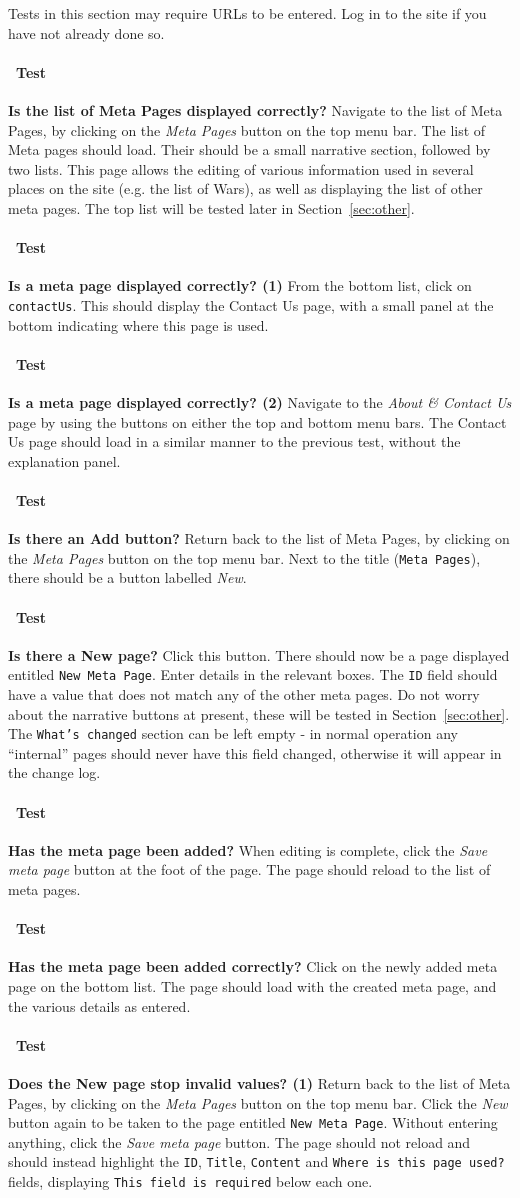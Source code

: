 \documentclass[12pt]{article}
\newcounter{Test}
\newcommand{\test}[1]{%
\stepcounter{Test}%
\paragraph{\Circle\ Test \theTest} \textbf{#1} }
\begin{document}
Tests in this section may require URLs to be entered. Log in to the site if you have not already done so.

\test{Is the list of Meta Pages displayed correctly?}
Navigate to the list of Meta Pages, by clicking on the \textit{Meta Pages} button on the top menu bar. The list of Meta pages should load. Their should be a small narrative section, followed by two lists. This page allows the editing of various information used in several places on the site (e.g. the list of Wars), as well as displaying the list of other meta pages. The top list will be tested later in Section~\ref{sec:other}.

\test{Is a meta page displayed correctly? (1)}
From the bottom list, click on \texttt{contactUs}. This should display the Contact Us page, with a small panel at the bottom indicating where this page is used.

\test{Is a meta page displayed correctly? (2)}
Navigate to the \textit{About \& Contact Us} page by using the buttons on either the top and bottom menu bars. The Contact Us page should load in a similar manner to the previous test, without the explanation panel.

\test{Is there an Add button?}
Return back to the list of Meta Pages, by clicking on the \textit{Meta Pages} button on the top menu bar. Next to the title (\texttt{Meta Pages}), there should be a button labelled \textit{New}.

\test{Is there a New page?}
Click this button. There should now be a page displayed entitled \texttt{New Meta Page}. Enter details in the relevant boxes. The \texttt{ID} field should have a value that does not match any of the other meta pages. Do not worry about the narrative buttons at present, these will be tested in Section~\ref{sec:other}. The \texttt{What's changed} section can be left empty - in normal operation any ``internal'' pages should never have this field changed, otherwise it will appear in the change log.

\test{Has the meta page been added?}
When editing is complete, click the \textit{Save meta page} button at the foot of the page. The page should reload to the list of meta pages.

\test{Has the meta page been added correctly?}
Click on the newly added meta page on the bottom list. The page should load with the created meta page, and the various details as entered.

\test{Does the New page stop invalid values? (1)}
Return back to the list of Meta Pages, by clicking on the \textit{Meta Pages} button on the top menu bar. Click the \textit{New} button again to be taken to the page entitled \texttt{New Meta Page}. Without entering anything, click the \textit{Save meta page} button. The page should not reload and should instead highlight the \texttt{ID}, \texttt{Title}, \texttt{Content} and \texttt{Where is this page used?} fields, displaying \texttt{This field is required} below each one. 
\end{document}
